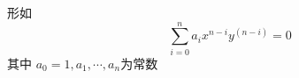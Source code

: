 
\begin{issues}
\issueDraft
\end{issues}

形如
\begin{equation}
\sum_{i=0}^{n}a_ix^{n-i}y^{(n-i)}=0
\end{equation}
其中 $a_0=1,a_1,\cdots,a_n$为常数